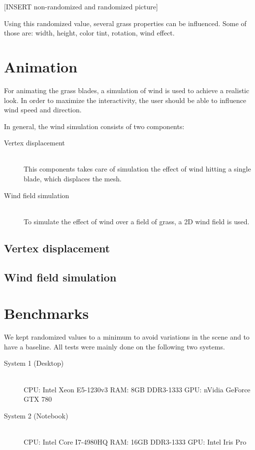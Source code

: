\documentclass[conference]{acmsiggraph}
\begin{document}
[INSERT non-randomized and randomized picture]

Using this randomized value, several grass properties can be influenced. Some of those are: width, height, color tint, rotation, wind effect.

\section{Animation}
For animating the grass blades, a simulation of wind is used to achieve a realistic look. In order to maximize the interactivity, the user should be able to influence wind speed and direction. 

In general, the wind simulation consists of two components:

\begin{description}
  \item[Vertex displacement] \hfill \\
  This components takes care of simulation the effect of wind hitting a single blade, which displaces the mesh.
  \item[Wind field simulation] \hfill \\
  To simulate the effect of wind over a field of grass, a 2D wind field is used.
\end{description}

\subsection{Vertex displacement}


\subsection{Wind field simulation}

\section{Benchmarks}
We kept randomized values to a minimum to avoid variations in the scene and to have a baseline. All tests were mainly done on the following two systems.

\begin{flushleft}
\begin{description}
  \item[System 1 (Desktop)] \hfill \\
  CPU: Intel Xeon E5-1230v3 \linebreak
  RAM: 8GB DDR3-1333 \linebreak
  GPU: nVidia GeForce GTX 780
  \item[System 2 (Notebook)] \hfill \\
  CPU: Intel Core I7-4980HQ \linebreak
  RAM: 16GB DDR3-1333 \linebreak
  GPU: Intel Iris Pro
\end{description}
\end{flushleft}
\end{document}
